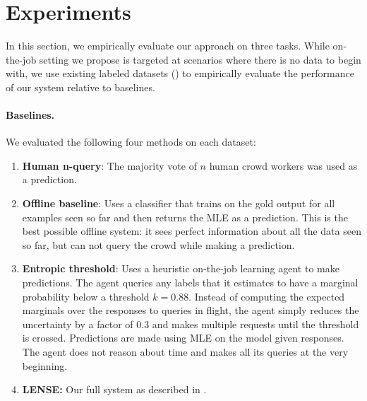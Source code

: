 \section{Experiments}
\label{sec:experiments}


In this section, we empirically evaluate our approach on three tasks. 
While on-the-job setting we propose is targeted at scenarios where there is no data to begin with, we use existing labeled datasets () to empirically evaluate the performance of our system relative to baselines.

\paragraph{Baselines.}
We evaluated the following four methods on each dataset:
\begin{enumerate}
  \item {\bf Human n-query}: The majority vote of $n$ human crowd workers was used as a prediction.
  \item {\bf Offline baseline}:
    Uses a classifier that trains on the gold output for all examples seen so far and then returns the MLE as a prediction.
    This is the best possible offline system: it sees perfect information about all the data seen so far, but can not query the crowd while making a prediction.
  \item {\bf Entropic threshold}: Uses a heuristic on-the-job learning agent to make predictions. 
    The agent queries any labels that it estimates to have a marginal probability below a threshold $k = 0.88$. %
    Instead of computing the expected marginals over the responses to queries in flight, the agent simply reduces the uncertainty by a factor of $0.3$ and makes multiple requests until the threshold is crossed. Predictions are made using MLE on the model given responses.
    The agent does not reason about time and makes all its queries at the very beginning.
  \item {\bf LENSE:} Our full system as described in .
\end{enumerate}


